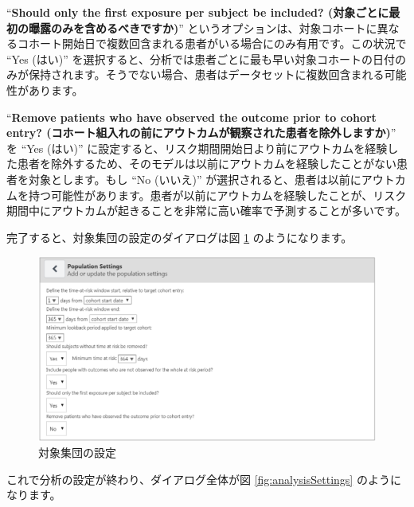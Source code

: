 \documentclass[
  11pt]{book}
\theoremstyle{definition}
\theoremstyle{definition}
\theoremstyle{definition}
\theoremstyle{definition}
\theoremstyle{remark}
\begin{document}
``\textbf{Should only the first exposure per subject be included? (対象ごとに最初の曝露のみを含めるべきですか)}'' というオプションは、対象コホートに異なるコホート開始日で複数回含まれる患者がいる場合にのみ有用です。この状況で ``Yes (はい)'' を選択すると、分析では患者ごとに最も早い対象コホートの日付のみが保持されます。そうでない場合、患者はデータセットに複数回含まれる可能性があります。

``\textbf{Remove patients who have observed the outcome prior to cohort entry? (コホート組入れの前にアウトカムが観察された患者を除外しますか)}'' を ``Yes (はい)'' に設定すると、リスク期間開始日より前にアウトカムを経験した患者を除外するため、そのモデルは以前にアウトカムを経験したことがない患者を対象とします。もし ``No (いいえ)'' が選択されると、患者は以前にアウトカムを持つ可能性があります。患者が以前にアウトカムを経験したことが、リスク期間中にアウトカムが起きることを非常に高い確率で予測することが多いです。

完了すると、対象集団の設定のダイアログは図 \ref{fig:populationSettings} のようになります。

\begin{figure}

{\centering \includegraphics[width=1\linewidth]{images/PatientLevelPrediction/populationSettings} 

}

\caption{対象集団の設定}\label{fig:populationSettings}
\end{figure}

これで分析の設定が終わり、ダイアログ全体が図 \ref{fig:analysisSettings} のようになります。
\end{document}
